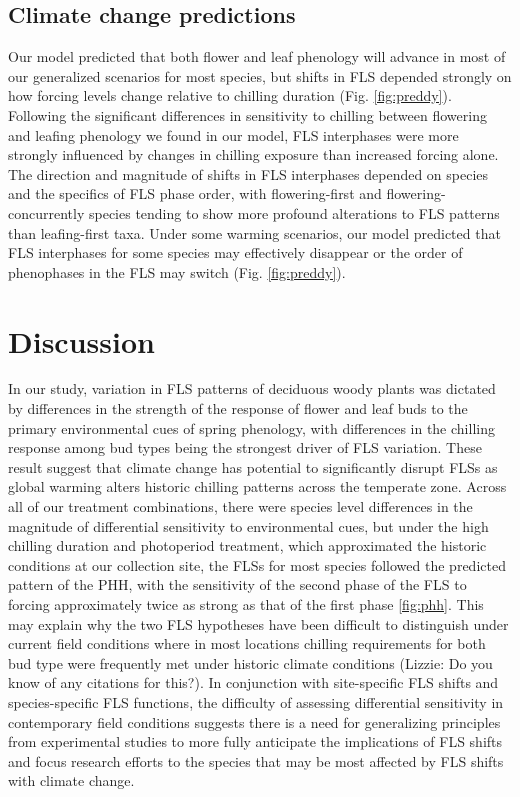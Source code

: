 \documentclass[11pt]{article}
\begin{document}
    \subsection*{Climate change predictions}
\noindent Our model predicted that both flower and leaf phenology will advance in most of our generalized scenarios for most species, but shifts in FLS depended strongly on how forcing levels change relative to chilling duration (Fig. \ref{fig:preddy}). Following the significant differences in sensitivity to chilling between flowering and leafing phenology we found in our model, FLS interphases were more strongly influenced by changes in chilling exposure than increased forcing alone. The direction and magnitude of shifts in FLS interphases depended on species and the specifics of FLS phase order, with flowering-first and flowering-concurrently species tending to show more profound alterations to FLS patterns than leafing-first taxa. Under some warming scenarios, our model predicted that  FLS interphases for some species may effectively disappear or the order of phenophases in the FLS may switch (Fig. \ref{fig:preddy}).

\section*{Discussion}
\noindent In our study, variation in FLS patterns of deciduous woody plants was dictated by differences in the strength of the response of flower and leaf buds to the primary environmental cues of spring phenology, with differences in the chilling response among bud types being the strongest driver of FLS variation. These result suggest that climate change has potential to significantly disrupt FLSs as global warming alters historic chilling patterns across the temperate zone. Across all of our treatment combinations, there were species level differences in the magnitude of differential sensitivity to environmental cues, but under the high chilling duration and photoperiod treatment, which approximated the historic conditions at our collection site, the FLSs for most species followed the predicted pattern of the PHH, with the sensitivity of the second phase of the FLS to forcing approximately twice as strong as that of the first phase \ref{fig:phh}. This may explain why the two FLS hypotheses have been difficult to distinguish under current field conditions where in most locations chilling requirements for both bud type were frequently met under historic climate conditions \citep{}(Lizzie: Do you know of any citations for this?). In conjunction with site-specific FLS shifts and species-specific FLS functions, the difficulty of assessing differential sensitivity in contemporary field conditions suggests there is a need for generalizing principles from experimental studies to more fully anticipate the implications of FLS shifts and focus research efforts to the species that may be most affected by FLS shifts with climate change.
\end{document}
